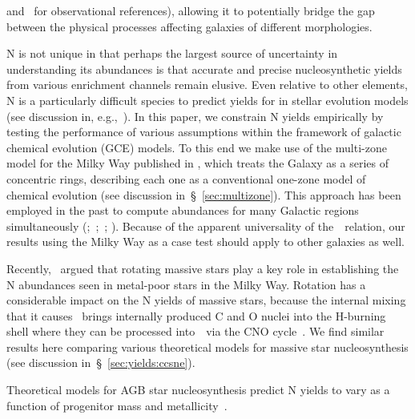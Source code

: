 \documentclass[ms.tex]{subfiles}
\begin{document}
and~\citealp*{Conroy2014} for observational references), allowing it to
potentially bridge the gap between the physical processes affecting galaxies of
different morphologies.
\par
N is not unique in that perhaps the largest source of uncertainty in
understanding its abundances is that accurate and precise nucleosynthetic yields
from various enrichment channels remain elusive.
Even relative to other elements, N is a particularly difficult species to
predict yields for in stellar evolution models (see discussion in,
e.g.,~\citealp{Andrews2017}).
In this paper, we constrain N yields empirically by testing the performance of
various assumptions within the framework of galactic chemical evolution (GCE)
models.
To this end we make use of the multi-zone model for the Milky Way published in
\citet{Johnson2021}, which treats the Galaxy as a series of concentric rings,
describing each one as a conventional one-zone model of chemical evolution
(see discussion in~\S~\ref{sec:multizone}).
This approach has been employed in the past to compute abundances for many
Galactic regions simultaneously (\citealp{Matteucci1989, Wyse1989, Prantzos1995,
Schoenrich2009};~\citealp*{Minchev2013, Minchev2014};~\citealp{Minchev2017};
\citealp*{Sharma2021}).
Because of the apparent universality of the~\ohno~relation, our results using
the Milky Way as a case test should apply to other galaxies as well.
\par
Recently,~\citet*{Grisoni2021} argued that rotating massive stars play a key
role in establishing the N abundances seen in metal-poor stars in the Milky Way.
Rotation has a considerable impact on the N yields of massive stars, because the
internal mixing that it causes~\citep{Zahn1992, Maeder1998, Lagarde2012} brings
internally produced C and O nuclei into the H-burning shell where they can be
processed into~\Nfourteen~via the CNO cycle~\citep{Heger2010, Frischknecht2016,
Andrews2017}.
We find similar results here comparing various theoretical models for
massive star nucleosynthesis (see discussion in~\S~\ref{sec:yields:ccsne}).
\par
Theoretical models for AGB star nucleosynthesis predict N yields to vary as a
function of progenitor mass and metallicity~\citep{Cristallo2011, Cristallo2015,
Karakas2010, Karakas2016, Karakas2018, Ventura2013, Ventura2014, Ventura2018,
Ventura2020}.
\end{document}
